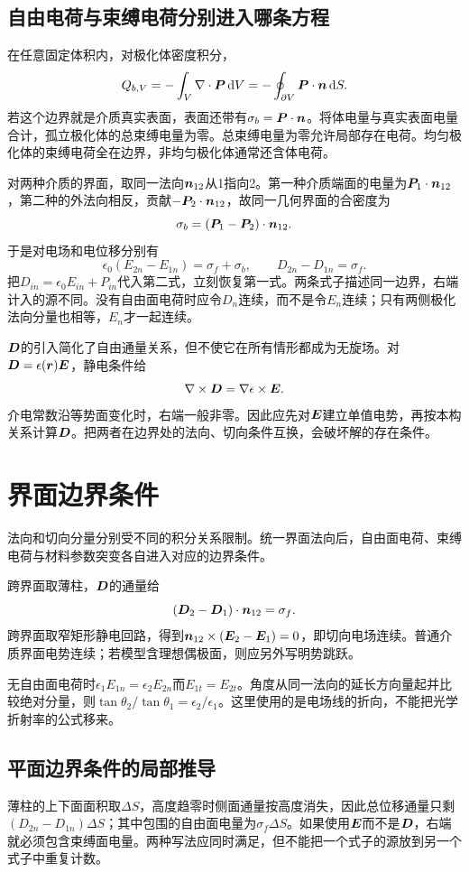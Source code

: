\subsection{自由电荷与束缚电荷分别进入哪条方程}\label{sec:es-charge-accounting}
在任意固定体积内，对极化体密度积分，
\[Q_{b,V}=-\int_V\nabla\cdot\bm{P}\mathop{}\!\mathrm d V
=-\oint_{\partial V}\bm{P}\cdot\bm{n}\mathop{}\!\mathrm d S.
\]
若这个边界就是介质真实表面，表面还带有$\sigma_b=\bm{P}\cdot\bm{n}$。将体电量与真实表面电量合计，孤立极化体的总束缚电量为零。总束缚电量为零允许局部存在电荷。均匀极化体的束缚电荷全在边界，非均匀极化体通常还含体电荷。

对两种介质的界面，取同一法向$\bm{n}_{12}$从1指向2。第一种介质端面的电量为$\bm{P}_1\cdot\bm{n}_{12}$，第二种的外法向相反，贡献$-\bm{P}_2\cdot\bm{n}_{12}$，故同一几何界面的合密度为
\[\sigma_b=(\bm{P}_1-\bm{P}_2)\cdot\bm{n}_{12}.
\]
于是对电场和电位移分别有
\[\epsilon_0(E_{2n}-E_{1n})=\sigma_f+\sigma_b,
\qquad D_{2n}-D_{1n}=\sigma_f.
\]
把$D_{in}=\epsilon_0E_{in}+P_{in}$代入第二式，立刻恢复第一式。两条式子描述同一边界，右端计入的源不同。没有自由面电荷时应令$D_n$连续，而不是令$E_n$连续；只有两侧极化法向分量也相等，$E_n$才一起连续。

$\bm{D}$的引入简化了自由通量关系，但不使它在所有情形都成为无旋场。对$\bm{D}=\epsilon(\bm{r})\bm{E}$，静电条件给
\[\nabla\times\bm{D}=\nabla\epsilon\times\bm{E}.
\]
介电常数沿等势面变化时，右端一般非零。因此应先对$\bm{E}$建立单值电势，再按本构关系计算$\bm{D}$。把两者在边界处的法向、切向条件互换，会破坏解的存在条件。



\section{界面边界条件}\label{sec:es4-boundary}
法向和切向分量分别受不同的积分关系限制。统一界面法向后，自由面电荷、束缚电荷与材料参数突变各自进入对应的边界条件。

跨界面取薄柱，$\bm{D}$的通量给
\[(\bm{D}_2-\bm{D}_1)\cdot\bm{n}_{12}=\sigma_f.
\]
跨界面取窄矩形静电回路，得到$\bm{n}_{12}\times(\bm{E}_2-\bm{E}_1)=0$，即切向电场连续。普通介质界面电势连续；若模型含理想偶极面，则应另外写明势跳跃。

无自由面电荷时$\epsilon_1E_{1n}=\epsilon_2E_{2n}$而$E_{1t}=E_{2t}$。角度从同一法向的延长方向量起并比较绝对分量，则$\tan\theta_2/\tan\theta_1=\epsilon_2/\epsilon_1$。这里使用的是电场线的折向，不能把光学折射率的公式移来。


\subsection{平面边界条件的局部推导}
薄柱的上下面面积取$\Delta S$，高度趋零时侧面通量按高度消失，因此总位移通量只剩$(D_{2n}-D_{1n})\Delta S$；其中包围的自由面电量为$\sigma_f\Delta S$。如果使用$\bm{E}$而不是$\bm{D}$，右端就必须包含束缚面电量。两种写法应同时满足，但不能把一个式子的源放到另一个式子中重复计数。

